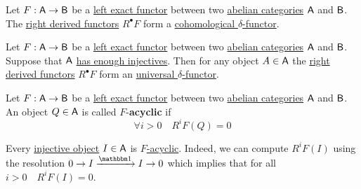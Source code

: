 \documentclass[../../../main]{subfiles}
\begin{document}
\begin{theorem}
  Let \(F: \mathsf{A} \to \mathsf{B}\) be a \hyperref[def:exact-complex-functor]{left exact functor} between two \hyperref[def:abelian-category]{abelian categories} \(\mathsf{A}\) and \(\mathsf{B}\).
  The \hyperref[def:right-derived-functor]{right derived functors} \(R^{\bullet}F\) form a \hyperref[def:delta-functor]{cohomological \(\delta\)-functor}.
\end{theorem}

\begin{theorem}
  Let \(F: \mathsf{A} \to \mathsf{B}\) be a \hyperref[def:exact-complex-functor]{left exact functor} between two \hyperref[def:abelian-category]{abelian categories} \(\mathsf{A}\) and \(\mathsf{B}\).
  Suppose that \(\mathsf{A}\) \hyperref[def:enough-injectives-projectives]{has enough injectives}.
  Then for any object \(A \in \mathsf{A}\) the \hyperref[def:right-derived-functor]{right derived functors} \(R^{\bullet}F\) form an \hyperref[def:universal-delta-functor]{universal \(\delta\)-functor}.
\end{theorem}

\begin{definition} \label{def:acyclic-object}
  Let \(F: \mathsf{A} \to \mathsf{B}\) be a \hyperref[def:exact-complex-functor]{left exact functor} between two \hyperref[def:abelian-category]{abelian categories} \(\mathsf{A}\) and \(\mathsf{B}\).
  An object \(Q \in \mathsf{A}\) is called \(F\)-\textbf{acyclic} if
  \begin{equation*}
    \forall i > 0 \quad R^{i}F(Q) = 0
  \end{equation*}
\end{definition}

\begin{example}
  Every \hyperref[def:injective-projective-object]{injective object} \(I \in \mathsf{A}\) is \hyperref[def:acyclic-object]{\(F\)-acyclic}.
  Indeed, we can compute \(R^{i}F(I)\) using the resolution \(0 \to I \xrightarrow{\id} I \to 0\) which implies that for all \(i > 0 \quad R^{i}F(I) = 0\).
\end{example}
\end{document}
